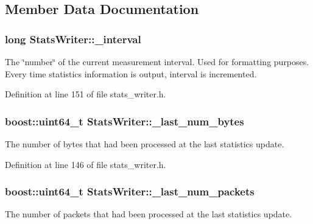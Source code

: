 \subsection{Member Data Documentation}
\hypertarget{class_stats_writer_a938a61cbb87e7c29824c99766898efb6}{
\subsubsection[{\_\-interval}]{\setlength{\rightskip}{0pt plus 5cm}long {\bf StatsWriter::\_\-interval}}}
\label{class_stats_writer_a938a61cbb87e7c29824c99766898efb6}
The \char`\"{}number\char`\"{} of the current measurement interval. Used for formatting purposes. Every time statistics information is output, interval is incremented. 

Definition at line 151 of file stats\_\-writer.h.

\hypertarget{class_stats_writer_a439f71be2d1560e7382a2174d1d83d0d}{
\subsubsection[{\_\-last\_\-num\_\-bytes}]{\setlength{\rightskip}{0pt plus 5cm}boost::uint64\_\-t {\bf StatsWriter::\_\-last\_\-num\_\-bytes}}}
\label{class_stats_writer_a439f71be2d1560e7382a2174d1d83d0d}
The number of bytes that had been processed at the last statistics update. 

Definition at line 146 of file stats\_\-writer.h.

\hypertarget{class_stats_writer_ac80670534878e9ebe11b34284637d32f}{
\subsubsection[{\_\-last\_\-num\_\-packets}]{\setlength{\rightskip}{0pt plus 5cm}boost::uint64\_\-t {\bf StatsWriter::\_\-last\_\-num\_\-packets}}}
\label{class_stats_writer_ac80670534878e9ebe11b34284637d32f}
The number of packets that had been processed at the last statistics update. 

